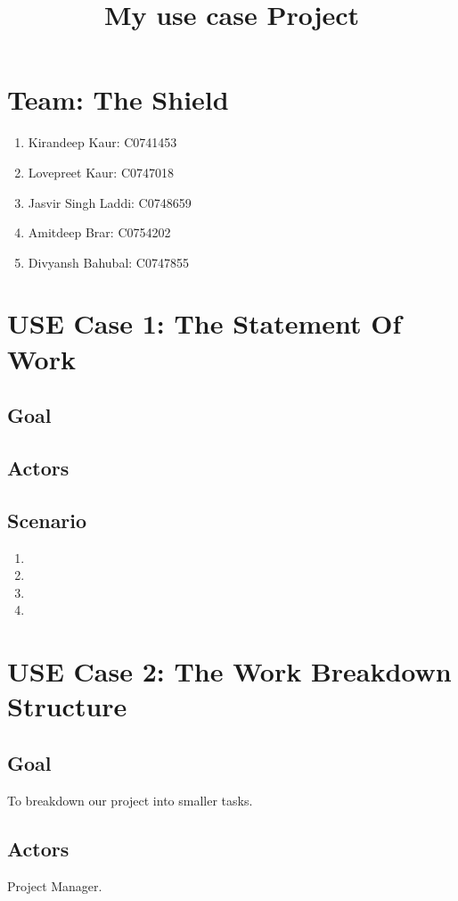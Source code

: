 \documentclass[10pt]{article}
\title{My use case Project}
\begin{document}
\maketitle
\tableofcontents

\section{Team: The Shield}
\begin{enumerate}
\item Kirandeep Kaur: C0741453
\item Lovepreet Kaur: C0747018
\item Jasvir Singh Laddi: C0748659
\item Amitdeep Brar: C0754202
\item Divyansh Bahubal: C0747855
\end{enumerate}

\section{USE Case 1: The Statement Of Work}
\subsection{Goal}
\subsection{Actors}
\subsection{Scenario}
\begin{enumerate}
\item
\item
\item
\item
\end{enumerate}

\section{USE Case 2: The Work Breakdown Structure}
\subsection{Goal}
To breakdown our project into smaller tasks.
\subsection{Actors}
Project Manager.
\end{document}
